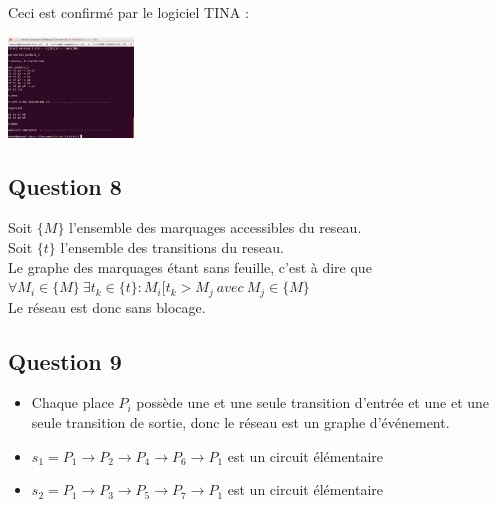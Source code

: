 Ceci est confirmé par le logiciel TINA :
\begin{center}
  \includegraphics[width=0.25\textwidth]{images/pflot_pochoir.png}
\end{center}

\subsection{Question 8}

Soit $\{M\}$ l'ensemble des marquages accessibles du reseau.\\
Soit $\{t\}$ l'ensemble des transitions du reseau.\\
Le graphe des marquages étant sans feuille, c'est à dire que $\forall M_i \in \{M\}\ \exists t_k \in\{t\} : M_i[t_k>M_j\ avec\ M_j\in \{M\}$ \\
Le réseau est donc sans blocage.

\subsection{Question 9}

\begin{itemize}
  \item Chaque place $P_i$ possède une et une seule transition d'entrée et une et une seule transition de sortie, donc le réseau est un graphe d'événement.
  \item $s_1 = P_1 \rightarrow P_2 \rightarrow P_4 \rightarrow P_6 \rightarrow P_1$ est un circuit élémentaire
  \item $s_2 = P_1 \rightarrow P_3 \rightarrow P_5 \rightarrow P_7 \rightarrow P_1$ est un circuit élémentaire
\end{itemize}

\newpage

